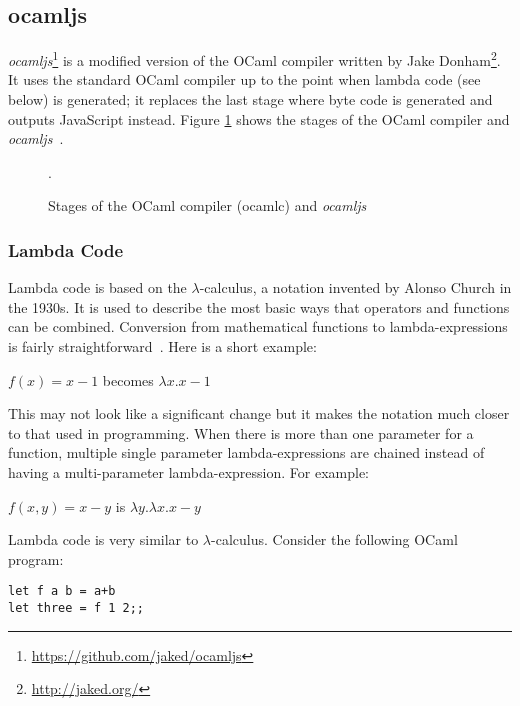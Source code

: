 \subsection{ocamljs}
\emph{ocamljs}\footnote{\url{https://github.com/jaked/ocamljs}} is a modified version of the OCaml compiler written by Jake Donham\footnote{\url{http://jaked.org/}}. It uses the standard OCaml compiler up to the point when lambda code (see below) is generated; it replaces the last stage where byte code is generated and outputs JavaScript instead. Figure \ref{fig:ocamlc} shows the stages of the OCaml compiler and \emph{ocamljs}~\cite{bib:oreilly}.

\begin{figure}
  \caption{Stages of the OCaml compiler (ocamlc) and \emph{ocamljs}~\cite{bib:oreilly}}.
  \label{fig:ocamlc}
\end{figure}

\subsubsection{Lambda Code}
Lambda code is based on the $\lambda$-calculus, a notation invented by Alonso Church in the 1930s. It is used to describe the most basic ways that operators and functions can be combined. Conversion from mathematical functions to lambda-expressions is fairly straightforward~\cite{bib:lambda}. Here is a short example:

\begin{center}
$f(x) = x - 1$ becomes $\lambda x.x-1$
\end{center}

This may not look like a significant change but it makes the notation much closer to that used in programming. When there is more than one parameter for a function, multiple single parameter lambda-expressions are chained instead of having a multi-parameter lambda-expression. For example:

\begin{center}
$f(x,y) = x-y$ is $\lambda y.\lambda x.x - y$
\end{center}

Lambda code is very similar to $\lambda$-calculus. Consider the following OCaml program:

\begin{lstlisting}[caption={simple.ml},label=lst:simple-ml]
let f a b = a+b
let three = f 1 2;;
\end{lstlisting}

